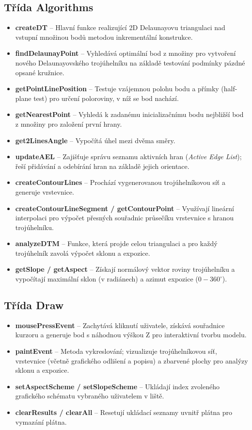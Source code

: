 \documentclass[12pt, a4paper]{article}
\begin{document}
\subsection{Třída Algorithms}
\begin{itemize}
    \item \textbf{createDT} – Hlavní funkce realizující 2D Delaunayovu triangulaci nad vstupní množinou bodů metodou inkrementální konstrukce.
    \item \textbf{findDelaunayPoint} – Vyhledává optimální bod z množiny pro vytvoření nového Delaunayovského trojúhelníku na základě testování podmínky pázdné opsané kružnice.
    \item \textbf{getPointLinePosition} – Testuje vzájemnou polohu bodu a přímky (half-plane test) pro určení poloroviny, v níž se bod nachází.
    \item \textbf{getNearestPoint} – Vyhledá k zadanému inicializačnímu bodu nejbližší bod z množiny pro založení první hrany.
    \item \textbf{get2LinesAngle} – Vypočítá úhel mezi dvěma směry.
    \item \textbf{updateAEL} – Zajišťuje správu seznamu aktivních hran (\textit{Active Edge List}); řeší přidávání a odebírání hran na základě jejich orientace.
    \item \textbf{createContourLines} – Prochází vygenerovanou trojúhelníkovou síť a generuje vrstevnice.
    \item \textbf{createContourLineSegment / getContourPoint} – Využívají lineární interpolaci pro výpočet přesných souřadnic průsečíku vrstevnice s hranou trojúhelníku.
    \item \textbf{analyzeDTM} – Funkce, která projde celou triangulaci a pro každý trojúhelník zavolá výpočet sklonu a expozice.
    \item \textbf{getSlope / getAspect} – Získají normálový vektor roviny trojúhelníku a vypočítají maximální sklon (v radiánech) a azimut expozice ($0-360^\circ$).
\end{itemize}

\subsection{Třída Draw}
\begin{itemize}
    \item \textbf{mousePressEvent} – Zachytává kliknutí uživatele, získává souřadnice kurzoru a generuje bod s náhodnou výškou Z pro interaktivní tvorbu modelu.
    \item \textbf{paintEvent} – Metoda vykreslování; vizualizuje trojúhelníkovou síť, vrstevnice (včetně grafického odlišení a popisu) a zbarvené plochy pro analýzy sklonu a expozice.
    \item \textbf{setAspectScheme / setSlopeScheme} – Ukládají index zvoleného grafického schématu vybraného uživatelem v liště.
    \item \textbf{clearResults / clearAll} – Resetují ukládací seznamy uvnitř plátna pro vymazání plátna.
\end{itemize}
\end{document}
